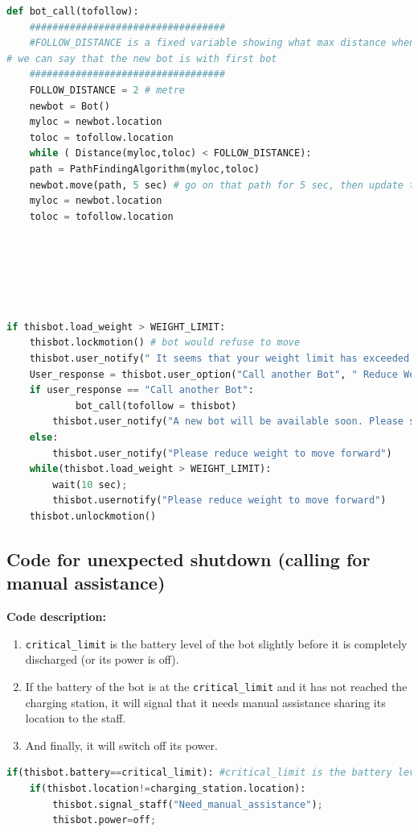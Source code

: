\documentclass{article}
\begin{document}
\begin{lstlisting}[language=Python, caption=Calling extra bot in case of heavy baggage]
def bot_call(tofollow):
	##################################
	#FOLLOW_DISTANCE is a fixed variable showing what max distance when 
# we can say that the new bot is with first bot
	##################################
	FOLLOW_DISTANCE = 2 # metre
	newbot = Bot()
	myloc = newbot.location
	toloc = tofollow.location
	while ( Distance(myloc,toloc) < FOLLOW_DISTANCE):
	path = PathFindingAlgorithm(myloc,toloc)
	newbot.move(path, 5 sec) # go on that path for 5 sec, then update the path
	myloc = newbot.location
	toloc = tofollow.location
	
	
	
	
	

if thisbot.load_weight > WEIGHT_LIMIT:
	thisbot.lockmotion() # bot would refuse to move
	thisbot.user_notify(" It seems that your weight limit has exceeded ")
	User_response = thisbot.user_option("Call another Bot", " Reduce Weight" )
	if user_response == "Call another Bot":
    		bot_call(tofollow = thisbot)
		thisbot.user_notify("A new bot will be available soon. Please share the weight among this bot and new upcoming bot")
	else:
		thisbot.user_notify("Please reduce weight to move forward")
	while(thisbot.load_weight > WEIGHT_LIMIT):
		wait(10 sec);
		thisbot.usernotify("Please reduce weight to move forward")
	thisbot.unlockmotion()


\end{lstlisting}
\subsection{Code for unexpected shutdown (calling for manual assistance)}
\label{code:d}
\textbf{Code description: }
\begin{enumerate}
\item \lstinline[language=Python]{critical_limit} is the battery level of the bot slightly before it is completely discharged (or its power is off).
\item If the battery of the bot is at the \lstinline[language=Python]{critical_limit} and it has not reached the charging station, it will signal that it needs manual assistance sharing its location to the staff.
\item And finally, it will switch off its power.
\end{enumerate}

\begin{lstlisting}[language=Python, caption=Code for Unexpected Shutdown]
if(thisbot.battery==critical_limit): #critical_limit is the battery level slightly before complete discharge, like 2%
	if(thisbot.location!=charging_station.location):
		thisbot.signal_staff("Need_manual_assistance");
		thisbot.power=off;
		
\end{lstlisting}
\end{document}
